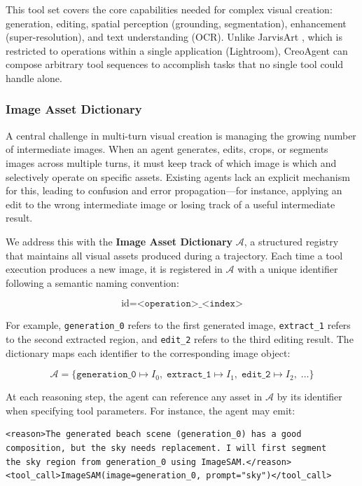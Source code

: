 \documentclass[11pt]{article}
\begin{document}
This tool set covers the core capabilities needed for complex visual creation: generation, editing, spatial perception (grounding, segmentation), enhancement (super-resolution), and text understanding (OCR). Unlike JarvisArt \cite{lin2025jarvisart}, which is restricted to operations within a single application (Lightroom), CreoAgent can compose arbitrary tool sequences to accomplish tasks that no single tool could handle alone.

\subsubsection{Image Asset Dictionary}

A central challenge in multi-turn visual creation is managing the growing number of intermediate images. When an agent generates, edits, crops, or segments images across multiple turns, it must keep track of which image is which and selectively operate on specific assets. Existing agents lack an explicit mechanism for this, leading to confusion and error propagation—for instance, applying an edit to the wrong intermediate image or losing track of a useful intermediate result.

We address this with the \textbf{Image Asset Dictionary} $\mathcal{A}$, a structured registry that maintains all visual assets produced during a trajectory. Each time a tool execution produces a new image, it is registered in $\mathcal{A}$ with a unique identifier following a semantic naming convention:

$$\text{id} = \texttt{<operation>\_<index>}$$

For example, \texttt{generation\_0} refers to the first generated image, \texttt{extract\_1} refers to the second extracted region, and \texttt{edit\_2} refers to the third editing result. The dictionary maps each identifier to the corresponding image object:

$$\mathcal{A} = \{ \texttt{generation\_0} \mapsto I_0, \; \texttt{extract\_1} \mapsto I_1, \; \texttt{edit\_2} \mapsto I_2, \; \ldots \}$$

At each reasoning step, the agent can reference any asset in $\mathcal{A}$ by its identifier when specifying tool parameters. For instance, the agent may emit:

\begin{verbatim}
<reason>The generated beach scene (generation_0) has a good 
composition, but the sky needs replacement. I will first segment 
the sky region from generation_0 using ImageSAM.</reason>
<tool_call>ImageSAM(image=generation_0, prompt="sky")</tool_call>
\end{verbatim}
\end{document}
